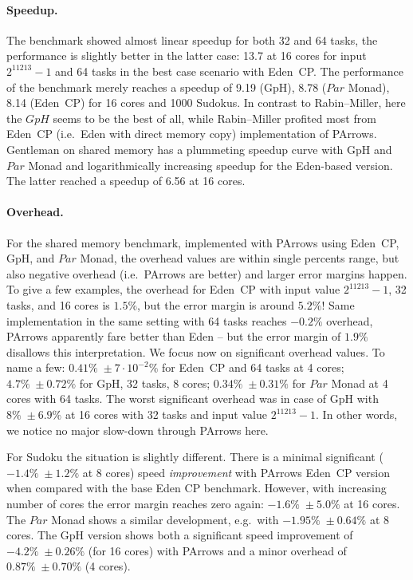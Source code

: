 \documentclass{jfp1}
\newcommand{\Conid}[1]{\mathit{#1}}
\DeclareRobustCommand{\hairspn}{\hspace{1pt}\nolinebreak}%
\DeclareRobustCommand{\ie}{{i.\hairspn{}e.~}}
\DeclareRobustCommand{\eg}{{e.\hairspn{}g.~}}
\begin{document}
\paragraph{Speedup.}
The \rmtest benchmark showed almost linear speedup for both 32 and 64 tasks, the performance is slightly better in the latter case: 13.7 at 16 cores for input $2^{11213}-1$ and 64 tasks in the best case scenario with Eden~CP. The performance of the \sudokutest benchmark merely reaches a speedup of 9.19 (GpH), 8.78 (\ensuremath{\Conid{Par}} Monad), 8.14 (Eden~CP) for 16 cores and 1000 Sudokus. In contrast to Rabin--Miller, here the \ensuremath{\Conid{GpH}} seems to be the best of all, while Rabin--Miller profited most from Eden~CP (\ie Eden with direct memory copy) implementation of PArrows. Gentleman on shared memory has a plummeting speedup curve with GpH and \ensuremath{\Conid{Par}} Monad and logarithmically increasing speedup for the Eden-based version. The latter reached a speedup of 6.56 at 16 cores.

\paragraph{Overhead.}

For the shared memory \rmtest benchmark, implemented with PArrows using Eden~CP, GpH, and \ensuremath{\Conid{Par}} Monad, the overhead values are within single percents range, but also negative overhead (\ie PArrows are better) and larger error margins happen. To give a few examples, the overhead for Eden~CP with input value $2^{11213}-1$, 32 tasks, and 16 cores is $1.5\%$, but the error margin is around $5.2\%$! Same implementation in the same setting with 64 tasks reaches $-0.2\%$ overhead, PArrows apparently fare better than Eden -- but the error margin of $1.9\%$ disallows this interpretation. We focus now on significant overhead values. To name a few: $0.41\%\; \pm 7\cdot 10^{-2}\%$ for Eden~CP and 64 tasks at 4 cores; $4.7\% \; \pm 0.72\%$ for GpH, 32 tasks, 8 cores; $0.34\% \; \pm 0.31\%$ for \ensuremath{\Conid{Par}} Monad at 4 cores with 64 tasks. The worst significant overhead was in case of GpH  with $8\% \; \pm 6.9\%$ at 16 cores with 32 tasks and input value $2^{11213}-1$. In other words, we notice no major slow-down through PArrows here.

For Sudoku the situation is slightly different. There is a minimal significant ($-1.4\% \; \pm 1.2\%$ at 8 cores) speed \emph{improvement} with PArrows Eden~CP version when compared with the base Eden CP benchmark. However, with increasing number of cores the error margin reaches zero again: $-1.6\% \; \pm 5.0\%$ at 16 cores. The \ensuremath{\Conid{Par}} Monad shows a similar development, \eg with $-1.95\% \; \pm 0.64\%$ at 8 cores. The GpH version shows both a significant speed improvement of $-4.2\% \; \pm 0.26\%$ (for 16 cores) with PArrows and a minor overhead of $0.87\% \; \pm 0.70\%$ (4 cores).
\end{document}
